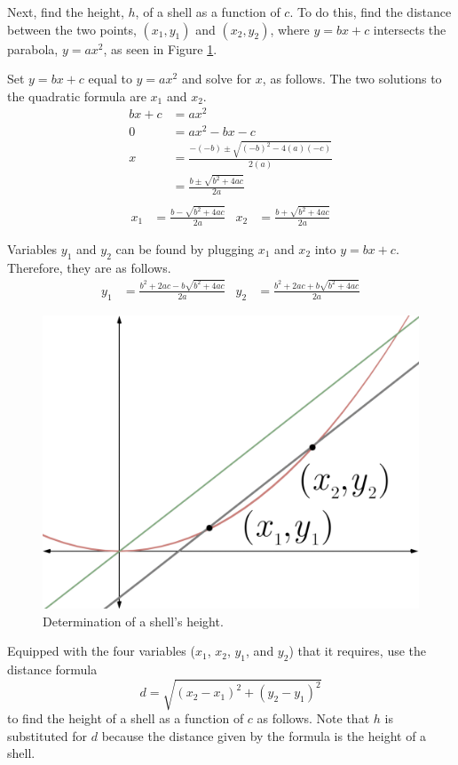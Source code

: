 \documentclass{article}
\begin{document}
Next, find the height, $h$, of a shell as a function of $c$. To do this, find the distance between the two points, $\left(x_1,y_1\right)$ and $\left(x_2,y_2\right)$, where $y=bx+c$ intersects the parabola, $y=ax^2$, as seen in Figure \ref{fig:shell2}.\par
Set $y=bx+c$ equal to $y=ax^2$ and solve for $x$, as follows. The two solutions to the quadratic formula are $x_1$ and $x_2$.
\begin{align*}
bx+c &= ax^2\\
0 &= ax^2-bx-c\\
x &= \frac{-(-b)\pm\sqrt{(-b)^2-4(a)(-c)}}{2(a)}\\
   &= \frac{b\pm\sqrt{b^2+4ac}}{2a}\\
\end{align*}
\vspace{-2em}
\begin{align*}
x_1 &= \frac{b-\sqrt{b^2+4ac}}{2a} &
x_2 &= \frac{b+\sqrt{b^2+4ac}}{2a}
\end{align*}\par
Variables $y_1$ and $y_2$ can be found by plugging $x_1$ and $x_2$ into $y=bx+c$. Therefore, they are as follows.
\begin{align*}
y_1 &= \frac{b^2+2ac-b\sqrt{b^2+4ac}}{2a} &
y_2 &= \frac{b^2+2ac+b\sqrt{b^2+4ac}}{2a}
\end{align*}
\begin{figure}[h!]
  \centering
  \includegraphics[width=0.57\linewidth]{Blender/ParabolaLineIntegration-ShellXY12-f2_0001.png}
  \caption{Determination of a shell's height.}
  \label{fig:shell2}
\end{figure}\par
Equipped with the four variables ($x_1$, $x_2$, $y_1$, and $y_2$) that it requires, use the distance formula$$d=\sqrt{\left(x_2-x_1\right)^2+\left(y_2-y_1\right)^2}$$to find the height of a shell as a function of $c$ as follows. Note that $h$ is substituted for $d$ because the distance given by the formula is the height of a shell.
\end{document}
